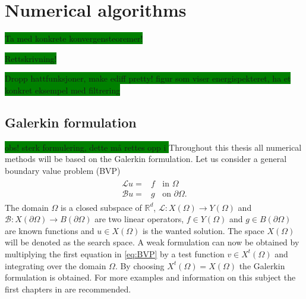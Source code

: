
\chapter{Numerical algorithms} %

\label{numerics} %



\colorbox{green}{Ta med konkrete konvergensteoremer! }

\colorbox{green}{Rettskrivning! }

\colorbox{green}{Dropp hattfunksjoner, make ediff pretty! figur som viser energispekteret, ha et konkret eksempel med filtrering }

\section{Galerkin formulation}

\colorbox{green}{obs! sterk formulering, dette må rettes opp i }
Throughout this thesis all numerical methods will be based on the Galerkin formulation. Let us consider a general boundary value problem (BVP)
\begin{align}
	\begin{split}
	\mathcal{L}u =& f \;\; \text{ in } \Omega\\
	\mathcal{B}u =& g \;\; \text{ on } \partial\Omega.
	\end{split}
	\label{eq:BVP}
\end{align}
The domain $\Omega$ is a closed subspace of $\mathbb{R}^d$, $\mathcal{L}: X(\Omega)\rightarrow Y(\Omega)$ and $\mathcal{B}: X(\partial\Omega)\rightarrow B(\partial\Omega)$ are two linear operators,
$f\in Y(\Omega)$ and $g\in B(\partial\Omega)$ are known functions and $u \in X(\Omega)$ is the wanted solution. 
The space $X(\Omega)$ will be denoted as the search space. A weak formulation can now be obtained by multiplying the first equation in \ref{eq:BVP} 
by a test function $v \in X^t(\Omega)$ and integrating over the domain $\Omega$. By choosing $X^t(\Omega) = X(\Omega)$ the Galerkin formulation is obtained.
For more examples and information on this subject the first chapters in \cite{Quarteroni} are recommended. 

